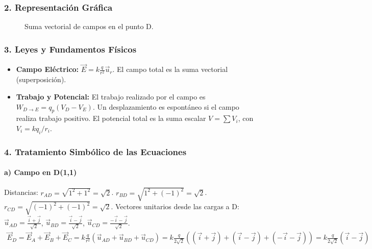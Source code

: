 \subsubsection*{2. Representación Gráfica}
\begin{figure}[H]
    \centering
    \caption{Suma vectorial de campos en el punto D.}
\end{figure}
\subsubsection*{3. Leyes y Fundamentos Físicos}
\begin{itemize}
    \item \textbf{Campo Eléctrico:} $\vec{E} = k\frac{q}{r^2}\vec{u}_r$. El campo total es la suma vectorial (superposición).
    \item \textbf{Trabajo y Potencial:} El trabajo realizado por el campo es $W_{D \to E} = q_p(V_D - V_E)$. Un desplazamiento es espontáneo si el campo realiza trabajo positivo. El potencial total es la suma escalar $V=\sum V_i$, con $V_i = k q_i / r_i$.
\end{itemize}
\subsubsection*{4. Tratamiento Simbólico de las Ecuaciones}
\paragraph{a) Campo en D(1,1)}
Distancias: $r_{AD} = \sqrt{1^2+1^2}=\sqrt{2}$. $r_{BD}=\sqrt{1^2+(-1)^2}=\sqrt{2}$. $r_{CD}=\sqrt{(-1)^2+(-1)^2}=\sqrt{2}$.
Vectores unitarios desde las cargas a D: $\vec{u}_{AD}=\frac{\vec{i}+\vec{j}}{\sqrt{2}}$, $\vec{u}_{BD}=\frac{\vec{i}-\vec{j}}{\sqrt{2}}$, $\vec{u}_{CD}=\frac{-\vec{i}-\vec{j}}{\sqrt{2}}$.
\begin{gather}
    \vec{E}_D = \vec{E}_A+\vec{E}_B+\vec{E}_C = k\frac{q}{r^2}(\vec{u}_{AD}+\vec{u}_{BD}+\vec{u}_{CD}) = k\frac{q}{2\sqrt{2}}((\vec{i}+\vec{j})+(\vec{i}-\vec{j})+(-\vec{i}-\vec{j})) = k\frac{q}{2\sqrt{2}}(\vec{i}-\vec{j})
\end{gather}
